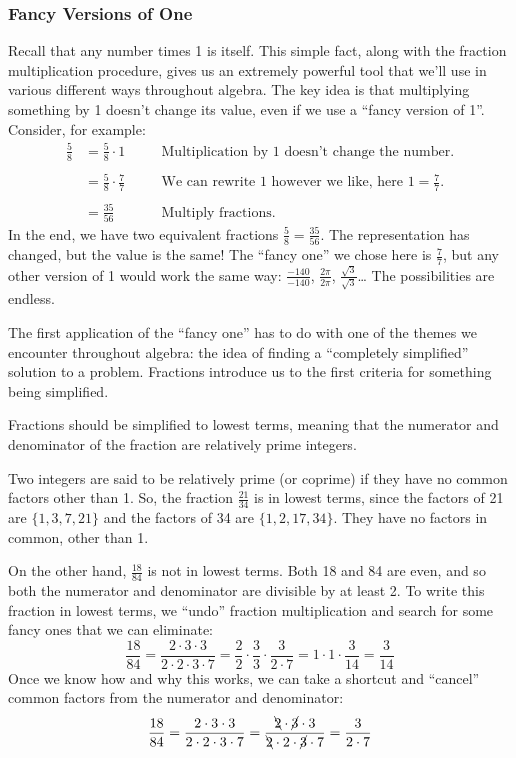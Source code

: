 \subsubsection*{Fancy Versions of One}

Recall that any number times 1 is itself. This simple fact, along with the fraction multiplication procedure, gives us an extremely powerful tool that we'll use in various different ways throughout algebra. The key idea is that multiplying something by 1 doesn't change its value, even if we use a ``fancy version of 1''. Consider, for example:
\[\begin{aligned}
\frac{5}{8} &= \frac{5}{8} \cdot 1
&& \quad\text{Multiplication by 1 doesn't change the number.}
\\
\\
&= \frac{5}{8} \cdot \frac{7}{7}
&& \quad\text{We can rewrite 1 however we like, here $1 = \frac{7}{7}$.}
\\
\\
&= \frac{35}{56}
&& \quad\text{Multiply fractions.}
\end{aligned}\]
In the end, we have two equivalent fractions $\frac{5}{8} = \frac{35}{56}$. The representation has changed, but the value is the same! The ``fancy one'' we chose here is $\frac{7}{7}$, but any other version of 1 would work the same way: $\frac{-140}{-140}$, $\frac{2\pi}{2\pi}$, $\frac{\sqrt3}{\sqrt3}$\ldots{} The possibilities are endless.

The first application of the ``fancy one'' has to do with one of the themes we encounter throughout algebra: the idea of finding a ``completely simplified'' solution to a problem. Fractions introduce us to the first criteria for something being simplified.

\begin{boxedcriteria}
Fractions should be simplified to \gls{lowest terms}, meaning that the numerator and denominator of the fraction are \gls{relatively prime} integers.
\end{boxedcriteria}

Two integers are said to be relatively prime (or coprime) if they have no common factors other than 1. So, the fraction $\frac{21}{34}$ is in lowest terms, since the factors of 21 are $\{1, 3, 7, 21\}$ and the factors of 34 are $\{1, 2, 17, 34\}$. They have no factors in common, other than 1.

On the other hand, $\frac{18}{84}$ is not in lowest terms. Both 18 and 84 are even, and so both the numerator and denominator are divisible by at least 2. To write this fraction in lowest terms, we ``undo'' fraction multiplication and search for some fancy ones that we can eliminate: \[\frac{18}{84} = \frac{2 \cdot 3 \cdot 3}{2 \cdot 2 \cdot 3 \cdot 7}  = \frac{2}{2}\cdot\frac{3}{3}\cdot\frac{3}{2\cdot 7} = 1\cdot1\cdot\frac{3}{14} = \frac{3}{14}\]
Once we know how and why this works, we can take a shortcut and ``cancel'' common factors from the numerator and denominator: \[\frac{18}{84} = \frac{2 \cdot 3 \cdot 3}{2 \cdot 2 \cdot 3 \cdot 7}=\frac{\bcancel{2} \cdot \cancel{3} \cdot 3}{\bcancel{2} \cdot 2 \cdot \cancel{3} \cdot 7}  = \frac{3}{2 \cdot 7}\]

